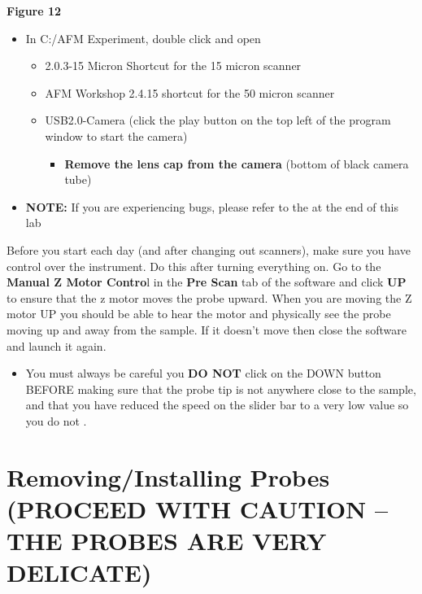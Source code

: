 \documentclass{../lab}
\begin{document}
\textbf{Figure 12}

\begin{itemize}
    \item In C:/AFM Experiment, double click and open
    \begin{itemize}
        \item 2.0.3-15 Micron Shortcut for the 15 micron scanner

        \item AFM Workshop 2.4.15 shortcut for the 50 micron scanner

        \item USB2.0-Camera (click the play button on the top left of the program window to start the camera)

        \begin{itemize}
            \item \textbf{Remove the lens cap from the camera }(bottom of black camera tube)

        \end{itemize}

    \end{itemize}

    \item \textbf{NOTE:} If you are experiencing bugs, please refer to the\textbf{} at the end of this lab

\end{itemize}

Before you start each day (and after changing out scanners), make sure you have control over the instrument. Do this after turning everything on. Go to the \textbf{Manual Z Motor Contro}l in the \textbf{Pre Scan} tab of the software and click \textbf{UP} to ensure that the z motor moves the probe upward.  When you are moving the Z motor UP you should be able to hear the motor and physically see the probe moving up and away from the sample.  If it doesn’t move then close the software and launch it again.

\begin{itemize}
    \item You must always be careful you \textbf{DO NOT} click on the DOWN button BEFORE making sure that the probe tip is not anywhere close to the sample, and that you have reduced the speed on the slider bar to a very low value so you do not \textbf{}.

\end{itemize}

\section{Removing/Installing Probes (PROCEED WITH CAUTION -- THE PROBES ARE VERY DELICATE)}
\end{document}
